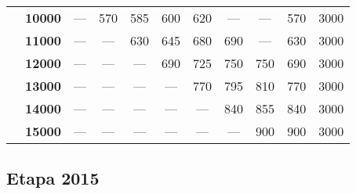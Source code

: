 \documentclass[12pt,a4paper,twoside,openright,titlepage,final]{article}
\begin{document}
\begin{table}[htbp!]
{\begin{tabular}{|ccccccccccc|}
\multicolumn{1}{|c|}{}                                & \textbf{10000}        & ---           & 570           & 585           & 600           & 620            & ---            & ---            & 570                                                                 & 3000                                                                  \\
\multicolumn{1}{|c|}{}                                & \textbf{11000}        & ---           & ---           & 630           & 645           & 680            & 690            & ---            & 630                                                                 & 3000                                                                  \\
\multicolumn{1}{|c|}{}                                & \textbf{12000}        & ---           & ---           & ---           & 690           & 725            & 750            & 750            & 690                                                                 & 3000                                                                  \\
\multicolumn{1}{|c|}{}                                & \textbf{13000}        & ---           & ---           & ---           & ---           & 770            & 795            & 810            & 770                                                                 & 3000                                                                  \\
\multicolumn{1}{|c|}{}                                & \textbf{14000}        & ---           & ---           & ---           & ---           & ---            & 840            & 855            & 840                                                                 & 3000                                                                  \\
\multicolumn{1}{|c|}{}                                & \textbf{15000}        & ---           & ---           & ---           & ---           & ---            & ---            & 900            & 900                                                                 & 3000                                                                  \\ \hline
\end{tabular}
}
\end{table}



\subsection{Etapa 2015}
\end{document}
